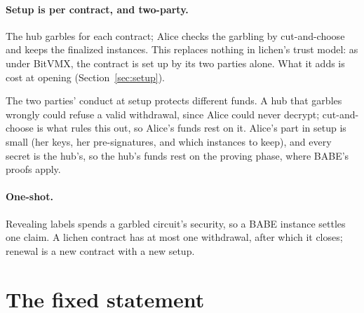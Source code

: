 \documentclass[11pt]{article}
\begin{document}
\paragraph{Setup is per contract, and two-party.} The hub garbles for
each contract; Alice checks the garbling by cut-and-choose and keeps the
finalized instances. This replaces nothing in lichen's trust model: as
under BitVMX, the contract is set up by its two parties alone. What it
adds is cost at opening (Section~\ref{sec:setup}).

The two parties' conduct at setup protects different funds. A hub that
garbles wrongly could refuse a valid withdrawal, since Alice could never
decrypt; cut-and-choose is what rules this out, so Alice's funds rest on
it. Alice's part in setup is small (her keys, her pre-signatures, and
which instances to keep), and every secret is the hub's, so the hub's
funds rest on the proving phase, where BABE's proofs apply.

\paragraph{One-shot.} Revealing labels spends a garbled circuit's
security, so a BABE instance settles one claim. A lichen contract has at
most one withdrawal, after which it closes; renewal is a new contract
with a new setup.

\section{The fixed statement}
\label{sec:fixed}
\end{document}
